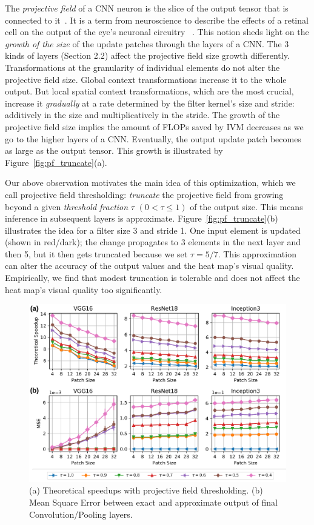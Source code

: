 The \textit{projective field} of a CNN neuron is the slice of the output tensor that is connected to it~\cite{basiccnnoperations}. It is a term from neuroscience to describe the effects of a retinal cell on the output of the eye's neuronal circuitry~ \cite{de2011projective}. This notion sheds light on the \textit{growth of the size} of the update patches through the layers of a CNN. The 3 kinds of layers (Section 2.2) affect the projective field size growth differently. Transformations at the granularity of individual elements do not alter the projective field size. Global context transformations increase it to the whole output. But local spatial context transformations, which are the most crucial, increase it \textit{gradually} at a rate determined by the filter kernel's size and stride: additively in the size and multiplicatively in the stride. The growth of the projective field size implies the amount of FLOPs saved by IVM decreases as we go to the higher layers of a CNN. Eventually, the output update patch becomes as large as the output tensor. This growth is illustrated by Figure~\ref{fig:pf_truncate}(a).

Our above observation motivates the main idea of this optimization, which we call projective field thresholding: \textit{truncate} the projective field from growing beyond a given \textit{threshold fraction} $\tau$ $(0 < \tau \leq 1)$ of the output size. This means inference in subsequent layers is approximate. Figure~\ref{fig:pf_truncate}(b) illustrates the idea for a filter size 3 and stride 1. One input element is updated (shown in red/dark); the change propagates to 3 elements in the next layer and then 5, but it then gets truncated because we set $\tau = 5/7$. This approximation can alter the accuracy of the output values and the heat map's visual quality. Empirically, we find that modest truncation is tolerable and does not affect the heat map's visual quality too significantly. 

\begin{figure}[t]
\includegraphics[width=\columnwidth]{images/proj_thresholding}
\vspace{-6mm}
\caption{(a) Theoretical speedups with projective field thresholding. (b) Mean Square Error between exact and approximate output of final Convolution/Pooling layers.}
\label{fig:proj_thresholding}
\vspace{-2mm}
\end{figure}


